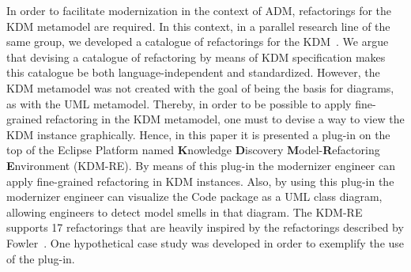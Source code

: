 In order to facilitate modernization in the context of ADM, refactorings for the KDM metamodel are required. In this context, in a parallel research line of the same group, we developed a catalogue of refactorings for the KDM~\cite{iri_catalogue_of_refactoring_2014}. We argue that devising a catalogue of refactoring by means of KDM specification makes this catalogue be both language-independent and standardized. However, the KDM metamodel was not created with the goal of being the basis for diagrams, as with the UML metamodel. Thereby, in order to be possible to apply fine-grained refactoring in the KDM metamodel, one must to devise a way to view the KDM instance graphically. 
%
%
Hence, in this paper it is presented a %
 plug-in on the top of the Eclipse Platform named  \textbf{K}nowledge \textbf{D}iscovery \textbf{M}odel-\textbf{R}efactoring \textbf{E}nvironment (KDM-RE). By means of this plug-in the modernizer engineer can apply fine-grained refactoring in KDM instances. Also, by using this plug-in the modernizer engineer can visualize the Code package as a UML class diagram, allowing engineers to detect model smells in that diagram. The KDM-RE supports 17 refactorings that are heavily inspired by the refactorings described by Fowler~\cite{refactImpro}. One hypothetical case study was developed in order to exemplify the use of the plug-in.




